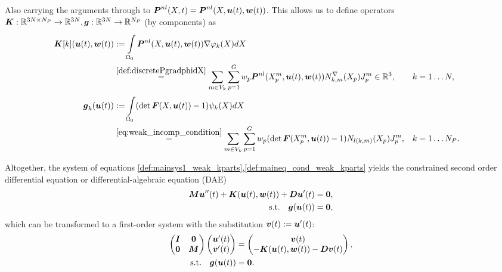 Also carrying the arguments through to $\boldsymbol{P}^{nl}(X,t) = \boldsymbol{P}^{nl}(X,\boldsymbol{u}(t),\boldsymbol{w}(t))$.
This allows us to define operators $\boldsymbol{K}: \mathbb{R}^{3N\times N_P}\to\mathbb{R}^{3N}, \boldsymbol{g}:\mathbb{R}^{3N}\to\mathbb{R}^{N_P}$ (by components) as
\begin{align}
	\vK[k](\vu(t),\vw(t)) &:= \intor\vPnl(X,\vu(t),\vw(t))\dpk dX\\
	&\re{def:discretePgradphidX} \sumvk\sumgp w_p\vPnl(\pmp,\vu(t),\vw(t))\dNkmp\jmp\in\R^3, && k=1\ldots N,\\
	\vg_k(\vu(t)) &:= \intor (\det\vF(X,\vu(t))-1)\psi_k(X)dX\\
	&\re{eq:weak_incomp_condition}\sumvk\sumgp w_p (\det\vF(\pmp,\vu(t))-1) \Nkmp\jmp, && k=1\ldots N_P.
\end{align}

Altogether, the system of equations \eqref{def:mainsys1_weak_kparts},\eqref{def:maineq_cond_weak_kparts} yields the constrained second order differential equation
or differential-algebraic equation (DAE)
\begin{align}
	\boldsymbol{M}\boldsymbol{u}''(t) + \boldsymbol{K}(\boldsymbol{u}(t),\boldsymbol{w}(t)) + \boldsymbol{D}\boldsymbol{u}'(t) &= \boldsymbol{0},\\
		\text{s.t.}\quad \boldsymbol{g}(\boldsymbol{u}(t)) &= \boldsymbol{0},
\end{align}
which can be transformed to a first-order system with the substitution $\boldsymbol{v}(t) := \boldsymbol{u}'(t)$:
\begin{align}
	\left(\begin{matrix}\boldsymbol{I} & \boldsymbol{0}\\ \boldsymbol{0} & \boldsymbol{M}\end{matrix}\right)\left(\begin{matrix}\boldsymbol{u}'(t)\\ \boldsymbol{v}'(t)\end{matrix}\right) &= \left(\begin{matrix}\boldsymbol{v}(t) \\ -\boldsymbol{K}(\boldsymbol{u}(t),\boldsymbol{w}(t)) - \boldsymbol{D}\boldsymbol{v}(t)\end{matrix}\right),\\
	\text{s.t.}\quad \boldsymbol{g}(\boldsymbol{u}(t))		&= \boldsymbol{0}.
\end{align}

